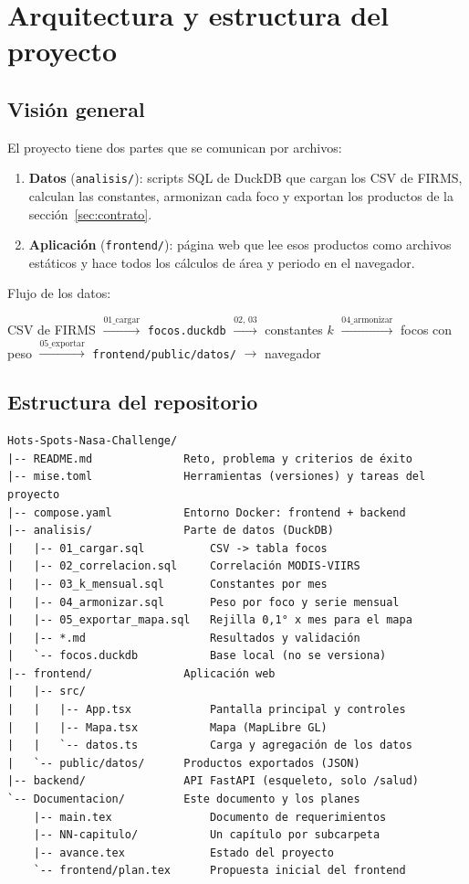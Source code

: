 \chapter{Arquitectura y estructura del proyecto}\label{cap:arquitectura}

\section{Visión general}

El proyecto tiene dos partes que se comunican por archivos:

\begin{enumerate}
  \item \textbf{Datos} (\texttt{analisis/}): scripts SQL de DuckDB que cargan los CSV de
        FIRMS, calculan las constantes, armonizan cada foco y exportan los productos de
        la sección~\ref{sec:contrato}.
  \item \textbf{Aplicación} (\texttt{frontend/}): página web que lee esos productos como
        archivos estáticos y hace todos los cálculos de área y periodo en el navegador.
\end{enumerate}

Flujo de los datos:

\begin{center}
\small
CSV de FIRMS $\xrightarrow{\text{01\_cargar}}$
\texttt{focos.duckdb} $\xrightarrow{\text{02, 03}}$
constantes $k$ $\xrightarrow{\text{04\_armonizar}}$
focos con peso $\xrightarrow{\text{05\_exportar}}$
\texttt{frontend/public/datos/} $\to$ navegador
\end{center}

\section{Estructura del repositorio}

\begin{verbatim}
Hots-Spots-Nasa-Challenge/
|-- README.md              Reto, problema y criterios de éxito
|-- mise.toml              Herramientas (versiones) y tareas del proyecto
|-- compose.yaml           Entorno Docker: frontend + backend
|-- analisis/              Parte de datos (DuckDB)
|   |-- 01_cargar.sql          CSV -> tabla focos
|   |-- 02_correlacion.sql     Correlación MODIS-VIIRS
|   |-- 03_k_mensual.sql       Constantes por mes
|   |-- 04_armonizar.sql       Peso por foco y serie mensual
|   |-- 05_exportar_mapa.sql   Rejilla 0,1° x mes para el mapa
|   |-- *.md                   Resultados y validación
|   `-- focos.duckdb           Base local (no se versiona)
|-- frontend/              Aplicación web
|   |-- src/
|   |   |-- App.tsx            Pantalla principal y controles
|   |   |-- Mapa.tsx           Mapa (MapLibre GL)
|   |   `-- datos.ts           Carga y agregación de los datos
|   `-- public/datos/      Productos exportados (JSON)
|-- backend/               API FastAPI (esqueleto, solo /salud)
`-- Documentacion/         Este documento y los planes
    |-- main.tex               Documento de requerimientos
    |-- NN-capitulo/           Un capítulo por subcarpeta
    |-- avance.tex             Estado del proyecto
    `-- frontend/plan.tex      Propuesta inicial del frontend
\end{verbatim}

